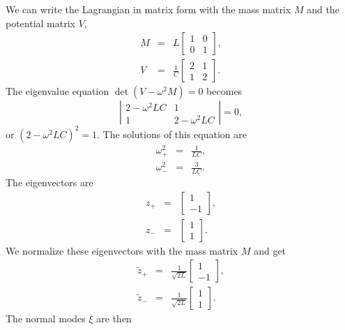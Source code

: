 \documentclass[letterpaper,11pt]{article}
\begin{document}
We can write the Lagrangian in matrix form with the mass matrix $M$ and the potential matrix $V$,
\begin{eqnarray*}
 M & = & L \left[ \begin{array}{cc}
            1 & 0 \\ 0 & 1
           \end{array} \right], \\
 V & = & \frac{1}{C} \left[ \begin{array}{cc}
            2 & 1 \\ 1 & 2
           \end{array} \right].
\end{eqnarray*}
The eigenvalue equation $\det(V - \omega^2 M) = 0$ becomes
\begin{equation*}
 \left| \begin{array}{cc}
  2 - \omega^2 L C & 1 \\ 1 & 2 - \omega^2 L C
 \end{array} \right| = 0,
\end{equation*}
or $(2 - \omega^2 LC)^2 = 1$.  The solutions of this equation are
\begin{eqnarray*}
 \omega_+^2 & = & \frac{1}{LC}, \\
 \omega_-^2 & = & \frac{3}{LC}.
\end{eqnarray*}
The eigenvectors are
\begin{eqnarray*}
 z_+ & = & \left[ \begin{array}{c} 1 \\ -1 \end{array} \right], \\
 z_- & = & \left[ \begin{array}{c} 1 \\ 1 \end{array} \right].
\end{eqnarray*}
We normalize these eigenvectors with the mass matrix $M$ and get
\begin{eqnarray*}
 \tilde{z}_+ & = & \frac{1}{\sqrt{2L}} \left[ \begin{array}{c} 1 \\ -1 \end{array} \right], \\
 \tilde{z}_- & = & \frac{1}{\sqrt{2L}} \left[ \begin{array}{c} 1 \\ 1 \end{array} \right].
\end{eqnarray*}
The normal modes $\xi$ are then
\end{document}
